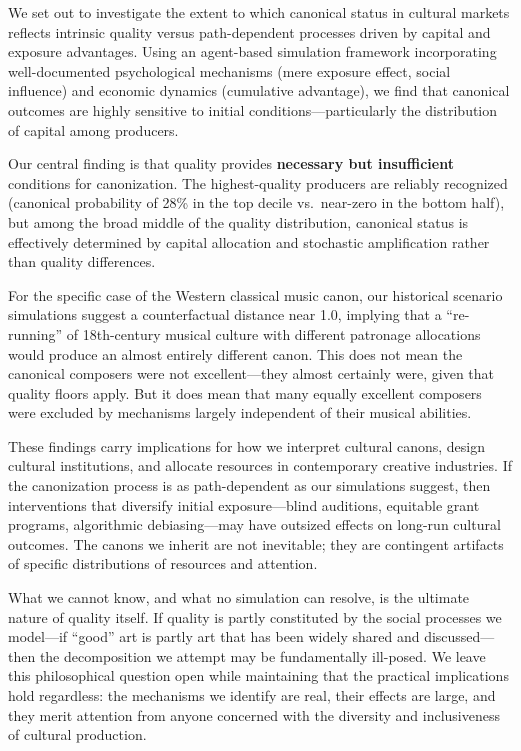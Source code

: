 \documentclass[11pt,a4paper]{article}
\begin{document}
We set out to investigate the extent to which canonical status in cultural markets reflects intrinsic quality versus path-dependent processes driven by capital and exposure advantages. Using an agent-based simulation framework incorporating well-documented psychological mechanisms (mere exposure effect, social influence) and economic dynamics (cumulative advantage), we find that canonical outcomes are highly sensitive to initial conditions---particularly the distribution of capital among producers.

Our central finding is that quality provides \textbf{necessary but insufficient} conditions for canonization. The highest-quality producers are reliably recognized (canonical probability of 28\% in the top decile vs.\ near-zero in the bottom half), but among the broad middle of the quality distribution, canonical status is effectively determined by capital allocation and stochastic amplification rather than quality differences.

For the specific case of the Western classical music canon, our historical scenario simulations suggest a counterfactual distance near 1.0, implying that a ``re-running'' of 18th-century musical culture with different patronage allocations would produce an almost entirely different canon. This does not mean the canonical composers were not excellent---they almost certainly were, given that quality floors apply. But it does mean that many equally excellent composers were excluded by mechanisms largely independent of their musical abilities.

These findings carry implications for how we interpret cultural canons, design cultural institutions, and allocate resources in contemporary creative industries. If the canonization process is as path-dependent as our simulations suggest, then interventions that diversify initial exposure---blind auditions, equitable grant programs, algorithmic debiasing---may have outsized effects on long-run cultural outcomes. The canons we inherit are not inevitable; they are contingent artifacts of specific distributions of resources and attention.

What we cannot know, and what no simulation can resolve, is the ultimate nature of quality itself. If quality is partly constituted by the social processes we model---if ``good'' art is partly art that has been widely shared and discussed---then the decomposition we attempt may be fundamentally ill-posed. We leave this philosophical question open while maintaining that the practical implications hold regardless: the mechanisms we identify are real, their effects are large, and they merit attention from anyone concerned with the diversity and inclusiveness of cultural production.
\end{document}
